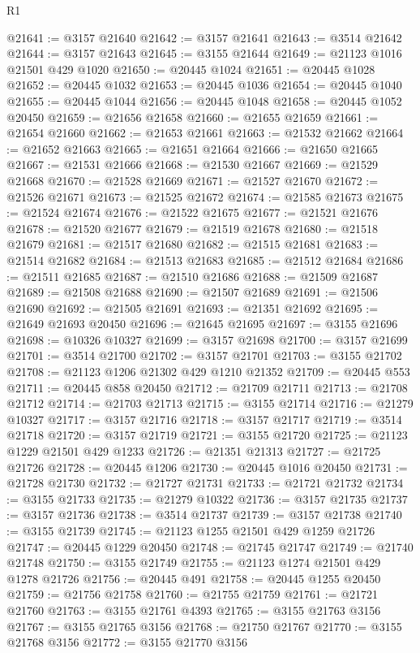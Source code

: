 \begin{lexlean}{R1}
\begin{coremodule}
@21641 := @3157 @21640
@21642 := @3157 @21641
@21643 := @3514 @21642
@21644 := @3157 @21643
@21645 := @3155 @21644
@21649 := @21123 @1016 @21501 @429 @1020
@21650 := @20445 @1024
@21651 := @20445 @1028
@21652 := @20445 @1032
@21653 := @20445 @1036
@21654 := @20445 @1040
@21655 := @20445 @1044
@21656 := @20445 @1048
@21658 := @20445 @1052 @20450
@21659 := @21656 @21658
@21660 := @21655 @21659
@21661 := @21654 @21660
@21662 := @21653 @21661
@21663 := @21532 @21662
@21664 := @21652 @21663
@21665 := @21651 @21664
@21666 := @21650 @21665
@21667 := @21531 @21666
@21668 := @21530 @21667
@21669 := @21529 @21668
@21670 := @21528 @21669
@21671 := @21527 @21670
@21672 := @21526 @21671
@21673 := @21525 @21672
@21674 := @21585 @21673
@21675 := @21524 @21674
@21676 := @21522 @21675
@21677 := @21521 @21676
@21678 := @21520 @21677
@21679 := @21519 @21678
@21680 := @21518 @21679
@21681 := @21517 @21680
@21682 := @21515 @21681
@21683 := @21514 @21682
@21684 := @21513 @21683
@21685 := @21512 @21684
@21686 := @21511 @21685
@21687 := @21510 @21686
@21688 := @21509 @21687
@21689 := @21508 @21688
@21690 := @21507 @21689
@21691 := @21506 @21690
@21692 := @21505 @21691
@21693 := @21351 @21692
@21695 := @21649 @21693 @20450
@21696 := @21645 @21695
@21697 := @3155 @21696
@21698 := @10326 @10327
@21699 := @3157 @21698
@21700 := @3157 @21699
@21701 := @3514 @21700
@21702 := @3157 @21701
@21703 := @3155 @21702
@21708 := @21123 @1206 @21302 @429 @1210 @21352
@21709 := @20445 @553
@21711 := @20445 @858 @20450
@21712 := @21709 @21711
@21713 := @21708 @21712
@21714 := @21703 @21713
@21715 := @3155 @21714
@21716 := @21279 @10327
@21717 := @3157 @21716
@21718 := @3157 @21717
@21719 := @3514 @21718
@21720 := @3157 @21719
@21721 := @3155 @21720
@21725 := @21123 @1229 @21501 @429 @1233
@21726 := @21351 @21313
@21727 := @21725 @21726
@21728 := @20445 @1206
@21730 := @20445 @1016 @20450
@21731 := @21728 @21730
@21732 := @21727 @21731
@21733 := @21721 @21732
@21734 := @3155 @21733
@21735 := @21279 @10322
@21736 := @3157 @21735
@21737 := @3157 @21736
@21738 := @3514 @21737
@21739 := @3157 @21738
@21740 := @3155 @21739
@21745 := @21123 @1255 @21501 @429 @1259 @21726
@21747 := @20445 @1229 @20450
@21748 := @21745 @21747
@21749 := @21740 @21748
@21750 := @3155 @21749
@21755 := @21123 @1274 @21501 @429 @1278 @21726
@21756 := @20445 @491
@21758 := @20445 @1255 @20450
@21759 := @21756 @21758
@21760 := @21755 @21759
@21761 := @21721 @21760
@21763 := @3155 @21761 @4393
@21765 := @3155 @21763 @3156
@21767 := @3155 @21765 @3156
@21768 := @21750 @21767
@21770 := @3155 @21768 @3156
@21772 := @3155 @21770 @3156

\end{coremodule}
\end{lexlean}
